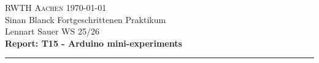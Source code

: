 \documentclass{article}
\begin{document}
\thispagestyle{firstpage}
\begin{center}
    \textsc{RWTH Aachen} \hfill \today\\
    Sinan Blanck \hfill Fortgeschrittenen Praktikum\\
    Lennart Sauer \hfill WS 25/26\\
    \vspace*{0.5cm}
    \textbf{\large Report: T15 - Arduino mini-experiments}
\end{center}
\hrule
\vspace{1cm}



\newpage



\newpage



\printbibliography
\end{document}
